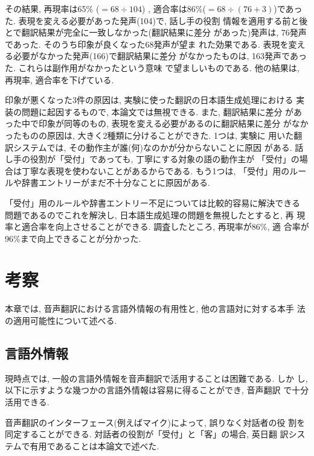 \vspace{5mm}

その結果, 再現率は65\% ($ = 68 \div 104 $) , 適合率は86\%($ = 68 \div
(76+3) $)であった. 表現を変える必要があった発声(104)で, 話し手の役割
情報を適用する前と後とで翻訳結果が完全に一致しなかった(翻訳結果に差分
があった)発声は, 76発声であった. そのうち印象が良くなった68発声が望ま
れた効果である. 表現を変える必要がなかった発声(166)で翻訳結果に差分
がなかったものは, 163発声であった. これらは副作用がなかったという意味
で望ましいものである. 他の結果は, 再現率, 適合率を下げている. 

印象が悪くなった3件の原因は, 実験に使った翻訳の日本語生成処理における
実装の問題に起因するもので, 本論文では無視できる. また, 翻訳結果に差分
があった中で印象が同等のもの, 表現を変える必要があるのに翻訳結果に差分
がなかったものの原因は, 大きく2種類に分けることができた. 1つは, 実験に
用いた翻訳システムでは, その動作主が誰(何)なのかが分からないことに原因
がある. 話し手の役割が「受付」であっても, 丁寧にする対象の語の動作主が
「受付」の場合は丁寧な表現を使わないことがあるからである. もう1つは, 
「受付」用のルールや辞書エントリーがまだ不十分なことに原因がある.

「受付」用のルールや辞書エントリー不足については比較的容易に解決できる
問題であるのでこれを解決し, 日本語生成処理の問題を無視したとすると, 再
現率と適合率を向上させることができる. 調査したところ, 再現率が86\%, 適
合率が96\%まで向上できることが分かった.

\section{考察}

本章では, 音声翻訳における言語外情報の有用性と, 他の言語対に対する本手
法の適用可能性について述べる. 

\subsection{言語外情報}

現時点では, 一般の言語外情報を音声翻訳で活用することは困難である. しか
し, 以下に示すような幾つかの言語外情報は容易に得ることができ, 音声翻訳
で十分活用できる. 

\hspace{-4mm}{\bf 対話者の役割}

音声翻訳のインターフェース(例えばマイク)によって, 誤りなく対話者の役
割を同定することができる. 対話者の役割が「受付」と「客」の場合, 英日翻
訳システムで有用であることは本論文で述べた. 

